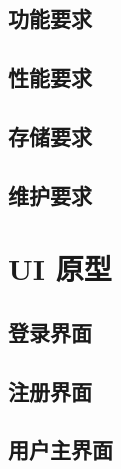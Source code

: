 \documentclass[12pt]{ctexart} %
\begin{document}
\subsection{功能要求}

\subsection{性能要求}

\subsection{存储要求}

\subsection{维护要求}

\section{UI 原型}

\subsection{登录界面}

\subsection{注册界面}

\subsection{用户主界面}
\end{document}
